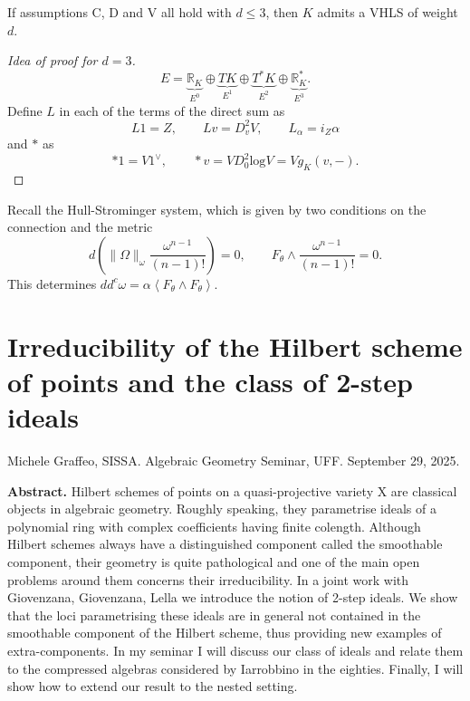 {\begin{theorem}
\label{theorem-GGA}
If assumptions C, D and V all hold with  $d \leq 3$,
then $K$ admits a VHLS of weight $d$.
\end{theorem}

\begin{proof}[Idea of proof for $d=3$]
$$
E=\underbrace{\mathbb{R}_K}_{E^0} \oplus \underbrace{TK}_{E^1}
\oplus \underbrace{T^*K}_{E^2} \oplus \underbrace{\mathbb{R}_K^*}_{E^3}.
$$
Define $L$ in each of the terms of the direct sum as
$$
L1=Z,\qquad Lv=D^2_vV,\qquad L_\alpha=i_Z\alpha
$$
and $*$ as
$$
*1=V 1^\vee,\qquad  *v=VD^2_0 \text{log}V=Vg_K(v,-).
$$
\end{proof}

\medskip\noindent
Recall the Hull-Strominger
system, which is given by two conditions
on the connection and the metric
$$
d\left(\|\Omega\|_\omega \frac{\omega^{n-1}}{(n-1)!}\right)=0,\qquad 
F_\theta \wedge \frac{\omega^{n-1}}{(n-1)!}=0.
$$
This determines $d d^c\omega=\alpha\left<F_\theta \wedge F_\theta\right>$.



\section{Irreducibility of the Hilbert scheme of points and the class of 2-step
ideals}
\label{section-irreducibility-of-hilbert-scheme-of-points}

\noindent
Michele Graffeo, SISSA.
Algebraic Geometry Seminar, UFF. 
September 29, 2025.

\medskip
{\bf Abstract.}
Hilbert schemes of points on a quasi-projective variety X are classical objects
in algebraic geometry. Roughly speaking, they parametrise ideals of a polynomial
ring with complex coefficients having finite colength. Although Hilbert schemes
always have a distinguished component called the smoothable component, their
geometry is quite pathological and one of the main open problems around them
concerns their irreducibility. In a joint work with Giovenzana, Giovenzana,
Lella we introduce the notion of 2-step ideals. We show that the loci
parametrising these ideals are in general not contained in the smoothable
component of the Hilbert scheme, thus  providing new examples of
extra-components.  In my seminar I will discuss our class of ideals and relate
them to the compressed algebras considered by Iarrobbino in the eighties.
Finally, I will show how to extend our result to the nested setting.
 

}
